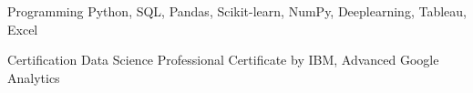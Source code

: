 
\begin{cvskills}
  \cvskill
    {Programming} %
    {Python, SQL, Pandas, Scikit-learn, NumPy, Deeplearning, Tableau, Excel} %

  \cvskill
    {Certification} %
    {Data Science Professional Certificate by IBM, Advanced Google Analytics} %
\end{cvskills}
